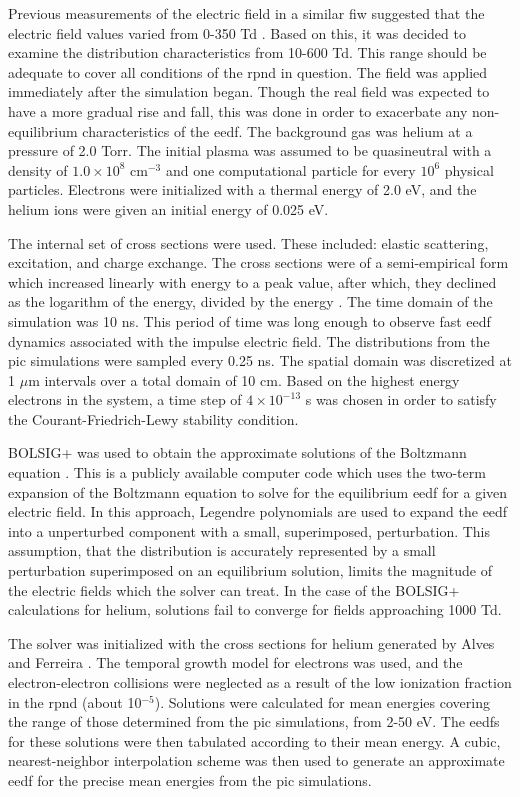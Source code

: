 Previous measurements of the electric field in a similar \acs{fiw} suggested
that the electric field values varied from 0-350 Td \cite{Takashima2011}. Based
on this, it was decided to examine the distribution characteristics from 10-600
Td. This range should be adequate to cover all conditions of the \acs{rpnd} in
question. The field was applied immediately after the simulation began. Though
the real field was expected to have a more gradual rise and fall, this was done
in order to exacerbate any non-equilibrium characteristics of the \acs{eedf}.
The background gas was helium at a pressure of 2.0 Torr. The initial plasma was
assumed to be quasineutral with a density of $1.0\times10^{8}$ cm$^{-3}$ and one
computational particle for every $10^6$ physical particles. Electrons were
initialized with a thermal energy of 2.0 eV, and the helium ions were given an
initial energy of 0.025 eV.

The internal set of cross sections were used. These included: elastic
scattering, excitation, and charge exchange. The cross sections were of a
semi-empirical form which increased linearly with energy to a peak value, after
which, they declined as the logarithm of the energy, divided by the energy
\cite{verboncoeur1993}. The time domain of the simulation was 10 ns. This period
of time was long enough to observe fast \acs{eedf} dynamics associated with the
impulse electric field. The distributions from the \acs{pic} simulations were
sampled every 0.25 ns. The spatial domain was discretized at 1 $\mu$m intervals
over a total domain of 10 cm. Based on the highest energy electrons in the
system, a time step of $4\times10^{-13}$ s was chosen in order to satisfy the
Courant-Friedrich-Lewy stability condition.

BOLSIG+ was used to obtain the approximate solutions of the Boltzmann equation
\cite{Hagelaar2005}. This is a publicly available computer code which uses the
two-term expansion of the Boltzmann equation to solve for the equilibrium
\acs{eedf} for a given electric field. In this approach, Legendre polynomials
are used to expand the \acs{eedf} into a unperturbed component with a small,
superimposed, perturbation. This assumption, that the distribution is accurately
represented by a small perturbation superimposed on an equilibrium solution,
limits the magnitude of the electric fields which the solver can treat. In the
case of the BOLSIG+ calculations for helium, solutions fail to converge for
fields approaching 1000 Td.

The solver was initialized with the cross sections for helium generated by Alves
and Ferreira \cite{Alves2013}. The temporal growth model for electrons was used,
and the electron-electron collisions were neglected as a result of the low
ionization fraction in the \acs{rpnd} (about 10$^{-5}$). Solutions were
calculated for mean energies covering the range of those determined from the
\acs{pic} simulations, from 2-50 eV. The \acs{eedf}s for these solutions were
then tabulated according to their mean energy. A cubic, nearest-neighbor
interpolation scheme was then used to generate an approximate \acs{eedf} for the
precise mean energies from the \acs{pic} simulations.


